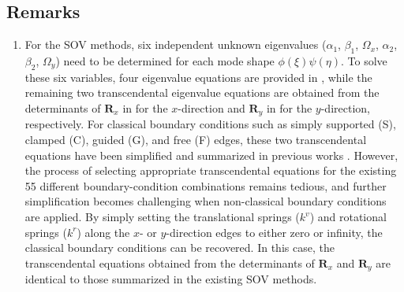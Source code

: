 \documentclass[preprint,12pt,number]{elsarticle}
\providecommand{\DIFaddtex}[1]{{\protect\color{blue}\uwave{#1}}} %
\providecommand{\DIFdeltex}[1]{{\protect\color{red}\sout{#1}}}                      %
\providecommand{\DIFaddbegin}{} %
\providecommand{\DIFaddend}{} %
\providecommand{\DIFdelbegin}{} %
\providecommand{\DIFdelend}{} %
\providecommand{\DIFadd}[1]{\texorpdfstring{\DIFaddtex{#1}}{#1}} %
\providecommand{\DIFdel}[1]{\texorpdfstring{\DIFdeltex{#1}}{}} %
\newcommand{\DIFscaledelfig}{0.5}
\newlength{\DIFdelgraphicswidth} %
\newlength{\DIFdelgraphicsheight} %
\newcommand{\DIFaddincludegraphics}[2][]{{\color{blue}\fbox{\DIFOincludegraphics[#1]{#2}}}} %
\newcommand{\DIFdelincludegraphics}[2][]{%
\sbox{\DIFdelgraphicsbox}{\DIFOincludegraphics[#1]{#2}}%
\settoboxwidth{\DIFdelgraphicswidth}{\DIFdelgraphicsbox} %
\settoboxtotalheight{\DIFdelgraphicsheight}{\DIFdelgraphicsbox} %
\scalebox{\DIFscaledelfig}{%
\parbox[b]{\DIFdelgraphicswidth}{\usebox{\DIFdelgraphicsbox}\\[-\baselineskip] \rule{\DIFdelgraphicswidth}{0em}}\llap{\resizebox{\DIFdelgraphicswidth}{\DIFdelgraphicsheight}{%
\setlength{\unitlength}{\DIFdelgraphicswidth}%
\begin{picture}(1,1)%
\thicklines\linethickness{2pt} %
{\color[rgb]{1,0,0}\put(0,0){\framebox(1,1){}}}%
{\color[rgb]{1,0,0}\put(0,0){\line( 1,1){1}}}%
{\color[rgb]{1,0,0}\put(0,1){\line(1,-1){1}}}%
\end{picture}%
}\hspace*{3pt}}} %
} %
\DeclareRobustCommand{\DIFaddbegin}{\DIFOaddbegin \let\includegraphics\DIFaddincludegraphics} %
\DeclareRobustCommand{\DIFaddend}{\DIFOaddend \let\includegraphics\DIFOincludegraphics} %
\DeclareRobustCommand{\DIFdelbegin}{\DIFOdelbegin \let\includegraphics\DIFdelincludegraphics} %
\DeclareRobustCommand{\DIFdelend}{\DIFOaddend \let\includegraphics\DIFOincludegraphics} %
\begin{document}
\subsection{Remarks}
\begin{enumerate}[label=(\roman*)]
	\item For the SOV methods, six independent unknown eigenvalues ($\alpha_1$, $\beta_1$, $\Omega_x$, $\alpha_2$, $\beta_2$, $\Omega_y$) need to be determined for each mode shape $\phi(\xi)\psi(\eta)$.  
	To solve these six variables, four eigenvalue equations are provided in , while the remaining two transcendental eigenvalue equations are obtained from the determinants of $\mathbf{R}_x$ in  for the $x$-direction and $\mathbf{R}_y$ in  for the $y$-direction, respectively.
	For classical boundary conditions such as simply supported (S), clamped (C), guided (G), and free (F) edges, these two transcendental equations have been simplified and summarized in previous works \citep{xing2020extended,xing2020improved,xing2022review}.  
	However, the process of selecting appropriate transcendental equations for the existing 55 different boundary-condition combinations remains tedious, and further simplification becomes challenging when non-classical boundary conditions are applied.
	By simply setting the translational springs (\DIFdelbegin \DIFdel{$k^v$}\DIFdelend \DIFaddbegin \DIFadd{$k^{v}_{\xi}$, $k^{v}_{\eta}$}\DIFaddend ) and rotational springs (\DIFdelbegin \DIFdel{$k^r$}\DIFdelend \DIFaddbegin \DIFadd{$k^r_{\xi}$, $k^r_{\eta}$}\DIFaddend ) along the $x$- or $y$-direction edges to either zero or infinity, the classical boundary conditions can be recovered.  
	In this case, the transcendental equations obtained from the determinants of $\mathbf{R}_x$ and $\mathbf{R}_y$ are identical to those summarized in the existing SOV methods.


\end{enumerate}
\end{document}
